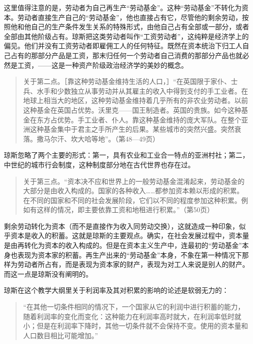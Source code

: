 这里值得注意的是，劳动者为自己再生产“劳动基金”。这种“劳动基金”不转化为资本。劳动者直接生产自己的“劳动基金”，他也直接占有它，尽管他的剩余劳动，按照他和他自己的生产条件发生关系的特殊形式，由他自己占有全部或一部分，或者全部由其他阶级占有。琼斯把这类劳动者叫作“工资劳动者”，这纯粹是经济学上的偏见。他们并没有工资劳动者即雇佣工人的任何特征。既然在资本统治下归工人自己占有的那部分产品是工资，那末归任何一个劳动者自己消费的那部分产品也就必然是工资，——这是一种资产阶级政治经济学的美妙的概念。

\begin{quote}{关于第二点。［靠这种劳动基金维持生活的人口，］“在英国限于家仆、士兵、水手和少数独立从事劳动并从其雇主的收入中得到支付的手工业者。在地球上相当大的地区，这种劳动基金维持着几乎所有的非农业劳动者。以前这种基金在英国占优势。沃里克——国王制造者。英国的贵族。如今这种基金在东方占优势。手工业者、仆人。靠这种基金维持的庞大军队。在整个亚洲这种基金集中于君主之手所产生的后果。某些城市的突然兴盛。突然衰落。撒马尔汗、坎大哈等地”。（第48—49页）}\end{quote}

琼斯忽略了两个主要的形式：第一，具有农业和工业合一特点的亚洲村社；第二，中世纪的城市行会制度，这种制度部分地在古代世界也存在过。

\begin{quote}{关于第三点。“资本决不应和世界上的一般劳动基金混淆起来，劳动基金的大部分是由收入构成的。国家的各种收入……都参加资本赖以形成的积累。在不同的国家和不同的社会发展阶段，它们以不同的程度参加这种积累。例如有这样的情况，即主要依靠工资和地租进行积累。”（第50页）}\end{quote}

剩余劳动转化为资本（而不是直接作为收入同劳动交换），这就造成一种印象，似乎资本是收入的积蓄。这就是琼斯的主要观点。确实，在社会发展过程中，资本量是由再转化为资本的收入构成的。但是在资本主义生产中，连最初的“劳动基金”本身也表现为资本家的积蓄。再生产出来的“劳动基金”本身，不象在第一种情况下那样为劳动者所占有，而是表现为资本家的财产，表现为对工人来说是别人的财产。而这一点是琼斯没有阐明的。

琼斯在这个教学大纲里关于利润率及其对积累的影响的论述是软弱无力的：

\begin{quote}{“在其他一切条件相同的情况下，一个国家从它的利润中进行积蓄的能力，随着利润率的变化而变化：这种能力在利润率高时就大，在利润率低时就小；但是在利润率下降时，其他一切条件就不会保持不变。使用的资本量和人口数目相比可能增加。”}\end{quote}

